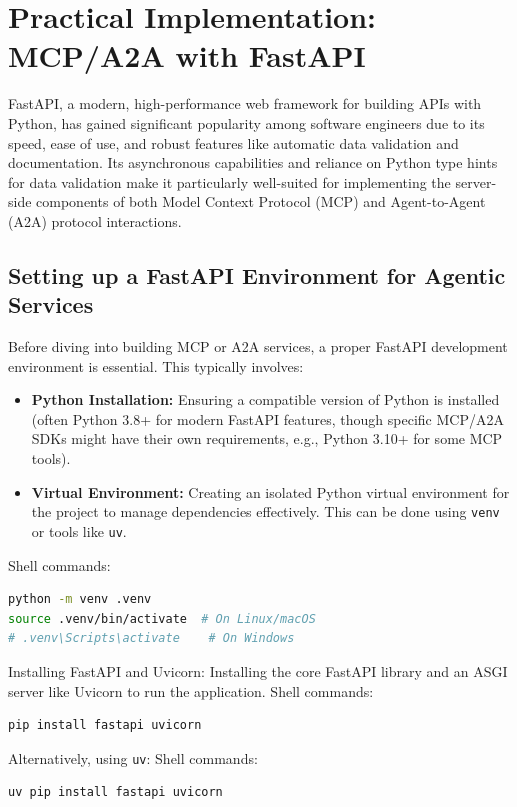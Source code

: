 \chapter{Practical Implementation: MCP/A2A with FastAPI}

FastAPI, a modern, high-performance web framework for building APIs with Python, has gained significant popularity among software engineers 
due to its speed, ease of use, and robust features like automatic data validation and documentation. Its asynchronous capabilities and reliance on 
Python type hints for data validation make it particularly well-suited for implementing the server-side components of both 
Model Context Protocol (MCP) and Agent-to-Agent (A2A) protocol interactions.

\section{Setting up a FastAPI Environment for Agentic Services}
Before diving into building MCP or A2A services, a proper FastAPI development environment is essential. This typically involves:
\begin{itemize}
    \item \textbf{Python Installation:} Ensuring a compatible version of Python is installed (often Python 3.8+ for modern FastAPI features, 
    though specific MCP/A2A SDKs might have their own requirements, e.g., Python 3.10+ for some MCP tools).
    \item \textbf{Virtual Environment:} Creating an isolated Python virtual environment for the project to manage dependencies effectively.
     This can be done using \texttt{venv} or tools like \texttt{uv}.
\end{itemize}
Shell commands:
\begin{lstlisting}[language=bash]
python -m venv .venv
source .venv/bin/activate  # On Linux/macOS
# .venv\Scripts\activate    # On Windows
\end{lstlisting}

Installing FastAPI and Uvicorn: Installing the core FastAPI library and an ASGI server like Uvicorn to run the application.
Shell commands:
\begin{lstlisting}[language=bash]
pip install fastapi uvicorn
\end{lstlisting}

Alternatively, using \texttt{uv}:
Shell commands:
\begin{lstlisting}[language=bash]
uv pip install fastapi uvicorn
\end{lstlisting}

